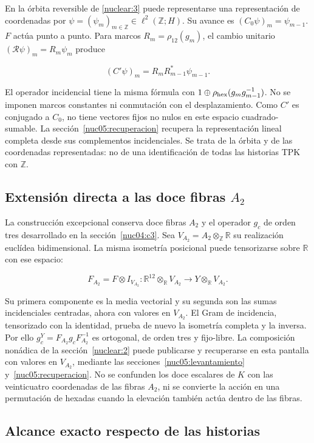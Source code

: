 En la órbita reversible de \cref{nuclear:3} puede representarse una representación de coordenadas por \(\psi=(\psi_m)_{m\in\mathbb Z}\in\ell^2(\mathbb Z;H)\). Su avance es \((C_0\psi)_m=\psi_{m-1}\). \(F\) actúa punto a punto. Para marcos \(R_m=\rho_{12}(g_m)\), el cambio unitario \((\mathscr R\psi)_m=R_m\psi_m\) produce

\[
(C'\psi)_m=R_mR_{m-1}^*\psi_{m-1}.
\]

El operador incidencial tiene la misma fórmula con \(1\oplus\rho_{\rm hex}(g_mg_{m-1}^{-1})\). No se imponen marcos constantes ni conmutación con el desplazamiento. Como \(C'\) es conjugado a \(C_0\), no tiene vectores fijos no nulos en este espacio cuadrado-sumable. La sección~\ref{nuc05:recuperacion} recupera la representación lineal completa desde sus complementos incidenciales. Se trata de la órbita y de las coordenadas representadas: no de una identificación de todas las historias TPK con \(\mathbb Z\).

\subsection{Extensión directa a las doce fibras \texorpdfstring{\(A_2\)}{A2}}\label{nuc05:a2}

La construcción excepcional conserva doce fibras \(A_2\) y el operador \(g_c\) de orden tres desarrollado en la sección~\ref{nuc04:c3}. Sea \(V_{A_2}=A_2\otimes_{\mathbb Z}\mathbb R\) su realización euclídea bidimensional. La misma isometría posicional puede tensorizarse sobre \(\mathbb R\) con ese espacio:

\[
F_{A_2}=F\otimes I_{V_{A_2}}:
\mathbb R^{12}\otimes_{\mathbb R}V_{A_2}
\longrightarrow Y\otimes_{\mathbb R}V_{A_2}.
\]

Su primera componente es la media vectorial y su segunda son las sumas incidenciales centradas, ahora con valores en \(V_{A_2}\). El Gram de incidencia, tensorizado con la identidad, prueba de nuevo la isometría completa y la inversa. Por ello \(g_c^Y=F_{A_2}g_cF_{A_2}^{-1}\) es ortogonal, de orden tres y fijo-libre. La composición nonádica de la sección~\ref{nuclear:2} puede publicarse y recuperarse en esta pantalla con valores en \(V_{A_2}\), mediante las secciones~\ref{nuc05:levantamiento} y~\ref{nuc05:recuperacion}. No se confunden los doce escalares de \(K\) con las veinticuatro coordenadas de las fibras \(A_2\), ni se convierte la acción en una permutación de hexadas cuando la elevación también actúa dentro de las fibras.

\subsection{Alcance exacto respecto de las historias}

